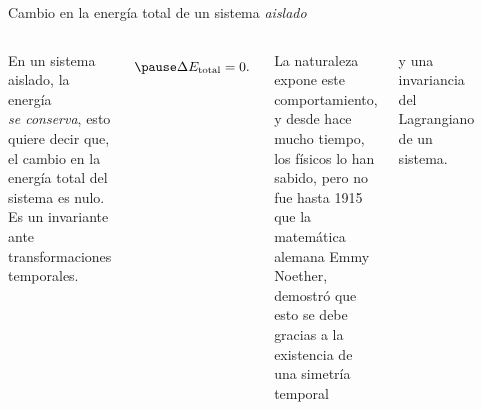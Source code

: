    \begin{frame}{Cambio en la energía total de un sistema \textit{aislado}}
        \begin{columns}
            \column[t]{6cm}
            \pause En un sistema aislado, la energía \\ \textit{se conserva}, esto quiere decir que, el cambio en la energía  total del sistema es nulo. Es un invariante ante transformaciones temporales.
            
            \begin{equation}
            \pause     \Delta E_{\text{total}}=0.
            \end{equation}
            
            \pause La naturaleza expone este comportamiento, y desde hace mucho tiempo, los físicos lo han sabido, pero no fue hasta 1915 que la matemática alemana Emmy Noether, demostró que esto se debe gracias a la existencia de una simetría temporal
            
            \column[t]{6cm}
            y una invariancia del Lagrangiano de un sistema.
            
            \begin{figure}
            \centering
            \includegraphics[scale=0.13]{figures/Noether.jpg}
            \end{figure}


\end{columns}
\end{frame}
